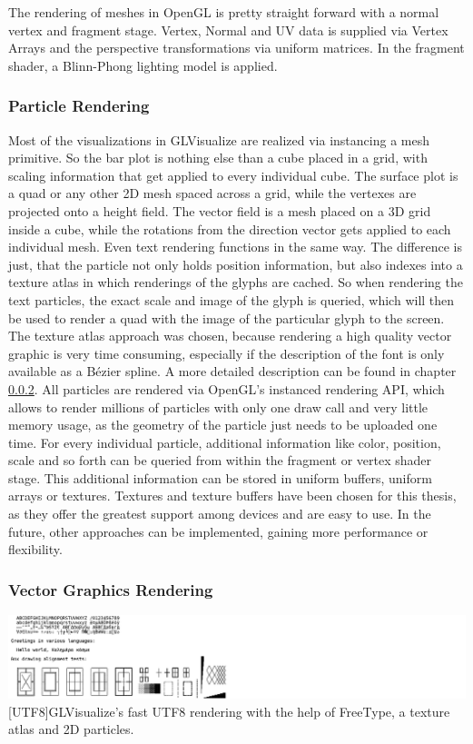 The rendering of meshes in OpenGL is pretty straight forward with a normal vertex and fragment stage.
Vertex, Normal and UV data is supplied via Vertex Arrays and the perspective transformations via uniform matrices.
In the fragment shader, a Blinn-Phong lighting model is applied.

\subsubsection{Particle Rendering}

Most of the visualizations in GLVisualize are realized via instancing a mesh primitive.
So the bar plot is nothing else than a cube placed in a grid, with scaling information that get applied to every individual cube. The surface plot is a quad or any other 2D mesh spaced across a grid, while the vertexes are projected onto a height field. The vector field is a mesh placed on a 3D grid inside a cube, while the rotations from the direction vector gets applied to each individual mesh. 
Even text rendering functions in the same way. The difference is just, that the particle not only holds position information, but also indexes into a texture atlas in which renderings of the glyphs are cached. So when rendering the text particles, the exact scale and image of the glyph is queried, which will then be used to render a quad with the image of the particular glyph to the screen.
The texture atlas approach was chosen, because rendering a high quality vector graphic is very time consuming, especially if the description of the font is only available as a Bézier spline. A more detailed description can be found in chapter \cref{vector rendering}.
All particles are rendered via \ac{OpenGL}'s instanced rendering API, which allows to render millions of particles with only one draw call and very little memory usage, as the geometry of the particle just needs to be uploaded one time.
For every individual particle, additional information like color, position, scale and so forth can be queried from within the fragment or vertex shader stage.
This additional information can be stored in uniform buffers, uniform arrays or textures. Textures and texture buffers have been chosen for this thesis, as they offer the greatest support among devices and are easy to use. In the future, other approaches can be implemented, gaining more performance or flexibility.


\subsubsection{Vector Graphics Rendering}\label{vector rendering}
\vspace{1em}
\begin{minipage}{\linewidth}
    \centering
    \includegraphics[width=0.9\linewidth]{graphics/utf8.png}
    [UTF8]{GLVisualize's fast UTF8 rendering with the help of FreeType, a texture atlas and 2D particles.}
    \label{fig:UTF8}
\end{minipage}

